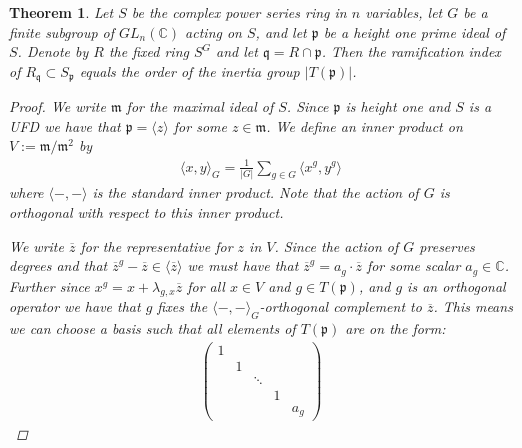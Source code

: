 \documentclass[11pt, a4paper, english]{article}
\newtheorem{theorem}{Theorem}[section]
\theoremstyle{definition}
\newcommand{\C}{\mathbb{C}}
\begin{document}
\begin{theorem}
\label{thm:ramification_index_equals_order_of_inertia_group}
Let $S$ be the complex power series ring in $n$ variables, let $G$ be  a finite subgroup of $GL_n(\C)$ acting on $S$, and let $\mathfrak{p}$ be a height one prime ideal of $S$. Denote by $R$ the fixed ring $S^G$ and let $\mathfrak{q} = R \cap \mathfrak{p}$. Then the ramification index of $R_\mathfrak{q} \subset S_\mathfrak{p}$ equals the order of the inertia group $|T(\mathfrak{p})|$.

\begin{proof}
We write $\mathfrak{m}$ for the maximal ideal of $S$. Since $\mathfrak{p}$ is height one and $S$ is a UFD we have that $\mathfrak{p} = \langle z \rangle$ for some $z \in \mathfrak{m}$. We define an inner product on $V := \mathfrak{m}/\mathfrak{m}^2$ by
\begin{align*}
\langle x, y \rangle_G = \frac{1}{|G|} \sum_{g \in G} \langle x^g,  y^g \rangle
\end{align*}
where $\langle -,- \rangle$ is the standard inner product. Note that the action of $G$ is orthogonal with respect to this inner product.

We write $\overline{z}$ for the representative for $z$ in $V$. Since the action of $G$ preserves degrees and that $\overline{z}^g - \overline{z} \in \langle \overline{z} \rangle$ we must have that $\overline{z}^g = a_g \cdot \overline{z}$ for some scalar $a_g \in \C$. Further since $x^g = x + \lambda_{g,x}\overline{z}$ for all $x \in V$ and $g \in T(\mathfrak{p})$, and $g$ is an orthogonal operator we have that $g$ fixes the $\langle -,- \rangle_G$-orthogonal complement to $\overline{z}$. This means we can choose a basis such that all elements of $T(\mathfrak{p})$ are on the form:
\begin{align*}
\begin{pmatrix}
1\\
& 1\\
&& \ddots\\
&&&1\\
&&&& a_g
\end{pmatrix}
\end{align*}


\end{proof}
\end{theorem}
\end{document}
